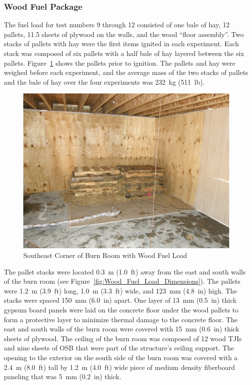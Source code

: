 \documentclass[12pt,oneside]{book}
\begin{document}
\subsubsection{Wood Fuel Package}
\label{sec:fire_suppression_pallet_fuel}

The fuel load for test numbers 9 through 12 consisted of one bale of hay, 12 pallets, 11.5 sheets of plywood on the walls, and the wood ``floor assembly''. Two stacks of pallets with hay were the first items ignited in each experiment. Each stack was composed of six pallets with a half bale of hay layered between the six pallets. Figure~\ref{fig:Wood_Fuel_Load} shows the pallets prior to ignition. The pallets and hay were weighed before each experiment, and the average mass of the two stacks of pallets and the bale of hay over the four experiments was 232~kg (511~lb).

\begin{figure}[!ht]
	\includegraphics[width=0.65\columnwidth]{../Figures/Pictures/Wood_Fuel_Package}
	\caption{Southeast Corner of Burn Room with Wood Fuel Load}
	\label{fig:Wood_Fuel_Load}
\end{figure}

The pallet stacks were located 0.3~m (1.0~ft) away from the east and south walls of the burn room (see Figure~\ref{fig:Wood_Fuel_Load_Dimensions}). The pallets were 1.2~m (3.9~ft) long, 1.0~m (3.3~ft) wide, and 123~mm (4.8~in) high. The stacks were spaced 150~mm (6.0~in) apart. One layer of 13~mm (0.5~in) thick gypsum board panels were laid on the concrete floor under the wood pallets to form a protective layer to minimize thermal damage to the concrete floor. The east and south walls of the burn room were covered with 15~mm (0.6~in) thick sheets of plywood. The ceiling of the burn room was composed of 12 wood TJIs and nine sheets of OSB that were part of the structure's ceiling support. The opening to the exterior on the south side of the burn room was covered with a 2.4~m (8.0~ft) tall by 1.2~m (4.0~ft) wide piece of medium density fiberboard paneling that was 5~mm (0.2~in) thick.
\end{document}
